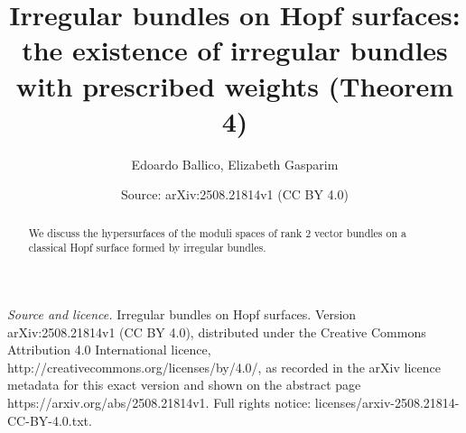 \documentclass[10pt,a4paper]{amsart}
\title[Irregular bundles with prescribed weights on Hopf surfaces]{Irregular bundles on Hopf surfaces: the existence of irregular bundles with prescribed weights (Theorem 4)}
\author{Edoardo Ballico, Elizabeth Gasparim}
\date{Source: arXiv:2508.21814v1 (CC BY 4.0)}
\theoremstyle{plain}
\theoremstyle{definition}
\theoremstyle{remark}
\begin{document}
\begin{abstract}
We discuss the hypersurfaces of the moduli spaces of rank $2$ vector bundles 
on a classical Hopf surface formed by irregular bundles.


\end{abstract}
\maketitle

\noindent\emph{Source and licence.} Irregular bundles on Hopf surfaces. Version arXiv:2508.21814v1 (CC BY 4.0), distributed under the Creative Commons Attribution 4.0 International licence, http://creativecommons.org/licenses/by/4.0/, as recorded in the arXiv licence metadata for this exact version and shown on the abstract page https://arxiv.org/abs/2508.21814v1. Full rights notice: licenses/arxiv-2508.21814-CC-BY-4.0.txt.\par\smallskip
\end{document}
